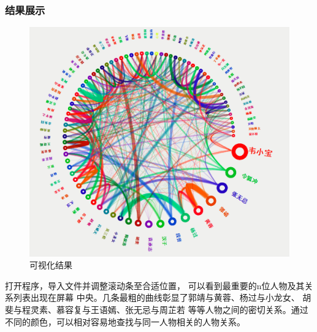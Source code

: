 \documentclass[a4paper,UTF8]{article}
\numberwithin{equation}{section}
\begin{document}
\subsubsection{结果展示}
\begin{figure}[htbp]
    \centering
    \includegraphics[width = 15cm]{task6-result.png}
    \caption{可视化结果}
    \label{task6-result}
\end{figure}
打开程序，导入文件并调整滚动条至合适位置，
可以看到最重要的n位人物及其关系列表出现在屏幕
中央。几条最粗的曲线彰显了郭靖与黄蓉、杨过与小龙女、
胡斐与程灵素、慕容复与王语嫣、张无忌与周芷若
等等人物之间的密切关系。通过不同的颜色，可以相对容易地查找与同一人物相关的人物关系。
\end{document}
